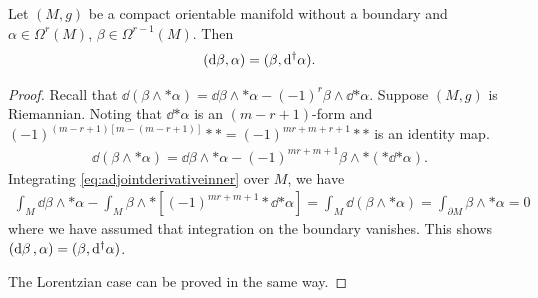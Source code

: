\documentclass[10pt]{article}
\begin{document}
\begin{theorem}
    Let $(M,g)$ be a compact orientable manifold without a boundary and $\alpha\in\Omega^r(M)$, $\beta\in\Omega^{r-1}(M)$.
    Then
    \begin{align}
        (\mathrm{d} \beta,\alpha)=(\beta,\mathrm{d}^\dagger \alpha).
    \end{align}
\end{theorem}
\begin{proof}
    Recall that $\dd(\beta\wedge\ast\alpha)=\dd{\beta}\wedge\ast\alpha-(-1)^r \beta\wedge\dd{\ast\alpha}$.
    Suppose $(M,g)$ is Riemannian.
    Noting that $\dd{\ast\alpha}$ is an $(m-r+1)$-form and $(-1)^{(m-r+1)[m-(m-r+1)]}\ast\ast=(-1)^{mr+m+r+1}\ast\ast$ is an identity map.
    \begin{align}\label{eq:adjointderivativeinner}
        \dd(\beta\wedge\ast\alpha)=\dd{\beta}\wedge\ast\alpha-(-1)^{mr+m+1}\beta\wedge\ast(\ast\dd{\ast\alpha}).
    \end{align}
    Integrating \eqref{eq:adjointderivativeinner} over $M$, we have 
    \begin{align}
        \int_M\dd{\beta}\wedge\ast\alpha-\int_M \beta\wedge\ast[(-1)^{mr+m+1}\ast\dd{\ast\alpha}]=\int_M\dd(\beta\wedge\ast\alpha)=\int_{\partial M}\beta\wedge\ast\alpha=0
    \end{align}
    where we have assumed that integration on the boundary vanishes.
    This shows $(\dd{\beta},\alpha)=(\beta,\mathrm{d}^\dagger\alpha)$.

    The Lorentzian case can be proved in the same way.
\end{proof}
\end{document}
